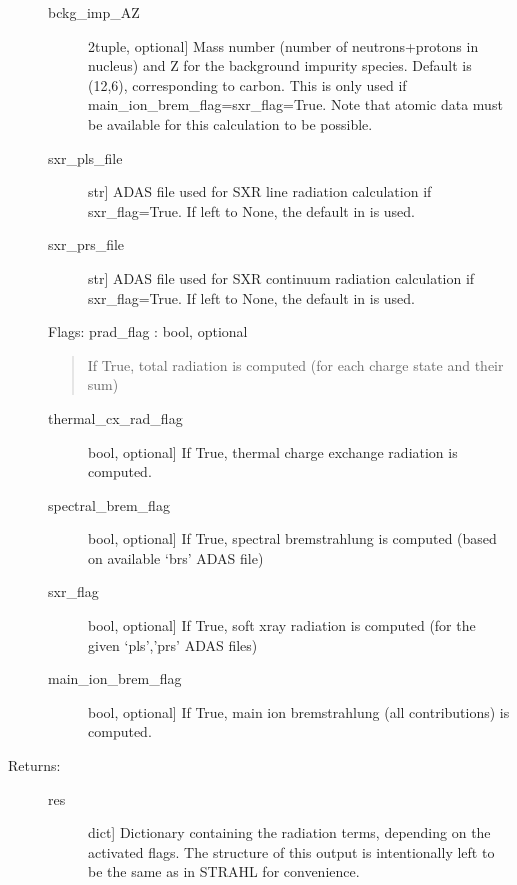 \documentclass[letterpaper,10pt,english]{sphinxmanual}
\begin{document}
\begin{fulllineitems}
\begin{description}
\begin{description}
\item[{bckg\_imp\_AZ}] \leavevmode{[}2\sphinxhyphen{}tuple, optional{]}
Mass number (number of neutrons+protons in nucleus) and Z for the background 
impurity species. Default is (12,6), corresponding to carbon.
This is only used if main\_ion\_brem\_flag=sxr\_flag=True.
Note that atomic data must be available for this calculation to be possible.

\item[{sxr\_pls\_file}] \leavevmode{[}str{]}
ADAS file used for SXR line radiation calculation if sxr\_flag=True. If left to None, the 
default in {\hyperref[\detokenize{aurora:aurora.atomic.adas_files_dict}]{}} is used.

\item[{sxr\_prs\_file}] \leavevmode{[}str{]}
ADAS file used for SXR continuum radiation calculation if sxr\_flag=True. If left to None, 
the default in {\hyperref[\detokenize{aurora:aurora.atomic.adas_files_dict}]{}} is used.

\end{description}

Flags:
prad\_flag : bool, optional
\begin{quote}

If True, total radiation is computed (for each charge state and their sum)
\end{quote}
\begin{description}
\item[{thermal\_cx\_rad\_flag}] \leavevmode{[}bool, optional{]}
If True, thermal charge exchange radiation is computed.

\item[{spectral\_brem\_flag}] \leavevmode{[}bool, optional{]}
If True, spectral bremstrahlung is computed (based on available ‘brs’ ADAS file)

\item[{sxr\_flag}] \leavevmode{[}bool, optional{]}
If True, soft x\sphinxhyphen{}ray radiation is computed (for the given ‘pls’,’prs’ ADAS files)

\item[{main\_ion\_brem\_flag}] \leavevmode{[}bool, optional{]}
If True, main ion bremstrahlung (all contributions) is computed.

\end{description}

\item[{Returns:}] \leavevmode\begin{description}
\item[{res}] \leavevmode{[}dict{]}
Dictionary containing the radiation terms, depending on the activated flags.
The structure of this output is intentionally left to be the same as in STRAHL
for convenience.


\end{description}
\end{description}
\end{fulllineitems}
\end{document}
